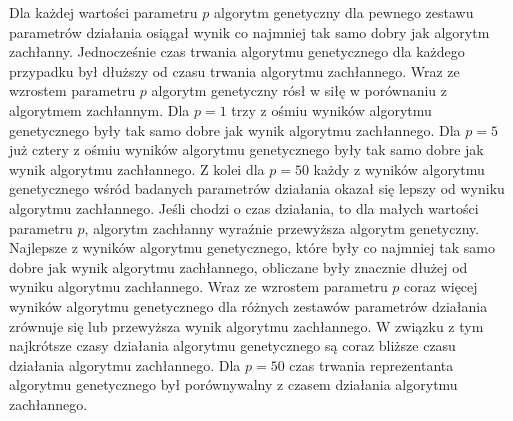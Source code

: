 \documentclass[pdflatex,11pt]{../aghdoc_version2}
\begin{document}
Dla każdej wartości parametru $p$ algorytm genetyczny dla pewnego zestawu parametrów działania osiągał wynik co najmniej tak samo dobry jak algorytm zachłanny. Jednocześnie czas trwania algorytmu genetycznego dla każdego przypadku był dłuższy od czasu trwania algorytmu zachłannego. Wraz ze wzrostem parametru $p$ algorytm genetyczny rósł w siłę w porównaniu z algorytmem zachłannym. Dla $p=1$ trzy z ośmiu wyników algorytmu genetycznego były tak samo dobre jak wynik algorytmu zachłannego. Dla $p=5$ już cztery z ośmiu wyników algorytmu genetycznego były tak samo dobre jak wynik algorytmu zachłannego. Z kolei dla $p=50$ każdy z wyników algorytmu genetycznego wśród badanych parametrów działania okazał się lepszy od wyniku algorytmu zachłannego. Jeśli chodzi o czas działania, to dla małych wartości parametru $p$, algorytm zachłanny wyraźnie przewyższa algorytm genetyczny. Najlepsze z wyników algorytmu genetycznego, które były co najmniej tak samo dobre jak wynik algorytmu zachłannego, obliczane były znacznie dłużej od wyniku algorytmu zachłannego. Wraz ze wzrostem parametru $p$ coraz więcej wyników algorytmu genetycznego dla różnych zestawów parametrów działania zrównuje się lub przewyższa wynik algorytmu zachłannego. W związku z tym najkrótsze czasy działania algorytmu genetycznego są coraz bliższe czasu działania algorytmu zachłannego. Dla $p=50$ czas trwania reprezentanta algorytmu genetycznego był porównywalny z czasem działania algorytmu zachłannego.  

\newpage
\cleardoublepage
{}
\listoffigures



\end{document}

